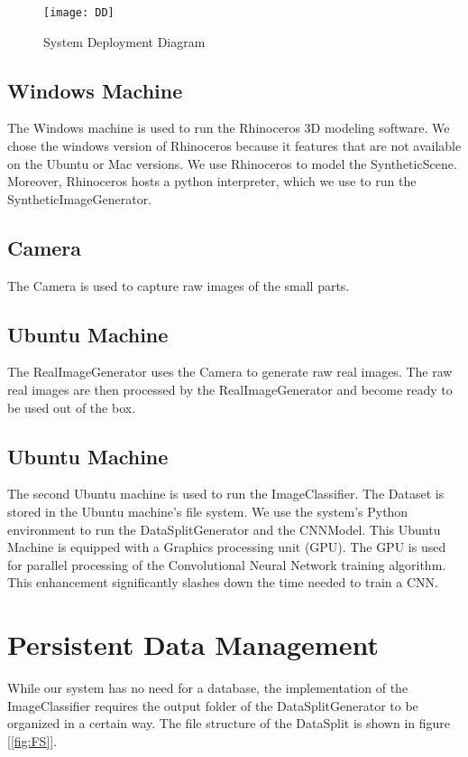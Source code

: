 \begin{figure}[h]
\centering
  \texttt{[image: DD]}
\caption{System Deployment Diagram}
\label{fig:DD}
\end{figure}

\subsection{Windows Machine}
The Windows machine is used to run the Rhinoceros 3D modeling software. We chose the windows version of Rhinoceros because it features that are not available on the Ubuntu or Mac versions. We use Rhinoceros to model the SyntheticScene. Moreover, Rhinoceros hosts a python interpreter, which we use to run the SyntheticImageGenerator.

\subsection{Camera}
The Camera is used to capture raw images of the small parts.

\subsection{Ubuntu Machine}
The RealImageGenerator uses the Camera to generate raw real images. The raw real images are then processed by the RealImageGenerator and become ready to be used out of the box.

\subsection{Ubuntu Machine}
The second Ubuntu machine is used to run the ImageClassifier. The Dataset is stored in the Ubuntu machine's file system. We use the system's Python environment to run the DataSplitGenerator and the CNNModel. This Ubuntu Machine is equipped with a Graphics processing unit (GPU). The GPU is used for parallel processing of the Convolutional Neural Network training algorithm. This enhancement significantly slashes down the time needed to train a CNN.

\section{Persistent Data Management}

While our system has no need for a database, the implementation of the ImageClassifier requires the output folder of the DataSplitGenerator to be organized in a certain way. The file structure of the DataSplit is shown in figure [\ref{fig:FS}].

